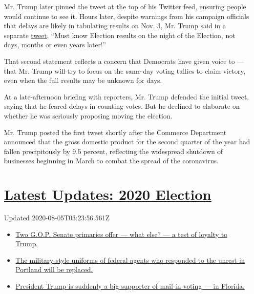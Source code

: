 Mr. Trump later pinned the tweet at the top of his Twitter feed,
ensuring people would continue to see it. Hours later, despite warnings
from his campaign officials that delays are likely in tabulating results
on Nov. 3, Mr. Trump said in a separate
\href{https://twitter.com/realDonaldTrump/status/1288933078287745024?s=20}{tweet},
``Must know Election results on the night of the Election, not days,
months or even years later!''

That second statement reflects a concern that Democrats have given voice
to --- that Mr. Trump will try to focus on the same-day voting tallies
to claim victory, even when the full results may be unknown for days.

At a late-afternoon briefing with reporters, Mr. Trump defended the
initial tweet, saying that he feared delays in counting votes. But he
declined to elaborate on whether he was seriously proposing moving the
election.

Mr. Trump posted the first tweet shortly after the Commerce Department
announced that the gross domestic product for the second quarter of the
year had fallen precipitously by 9.5 percent, reflecting the widespread
shutdown of businesses beginning in March to combat the spread of the
coronavirus.

\hypertarget{latest-updates-2020-election}{%
\section{\texorpdfstring{\href{https://www.nytimes3xbfgragh.onion/2020/08/04/us/elections/primary-election-michigan-arizona-kansas.html?action=click\&pgtype=Article\&state=default\&region=MAIN_CONTENT_1\&context=storylines_live_updates}{Latest
Updates: 2020
Election}}{Latest Updates: 2020 Election}}\label{latest-updates-2020-election}}

Updated 2020-08-05T03:23:56.561Z

\begin{itemize}
\tightlist
\item
  \href{https://www.nytimes3xbfgragh.onion/2020/08/04/us/elections/primary-election-michigan-arizona-kansas.html?action=click\&pgtype=Article\&state=default\&region=MAIN_CONTENT_1\&context=storylines_live_updates\#link-3924dd44}{Two
  G.O.P. Senate primaries offer --- what else? --- a test of loyalty to
  Trump.}
\item
  \href{https://www.nytimes3xbfgragh.onion/2020/08/04/us/elections/primary-election-michigan-arizona-kansas.html?action=click\&pgtype=Article\&state=default\&region=MAIN_CONTENT_1\&context=storylines_live_updates\#link-62a8e06b}{The
  military-style uniforms of federal agents who responded to the unrest
  in Portland will be replaced.}
\item
  \href{https://www.nytimes3xbfgragh.onion/2020/08/04/us/elections/primary-election-michigan-arizona-kansas.html?action=click\&pgtype=Article\&state=default\&region=MAIN_CONTENT_1\&context=storylines_live_updates\#link-32b39e33}{President
  Trump is suddenly a big supporter of mail-in voting --- in Florida.}
\end{itemize}

